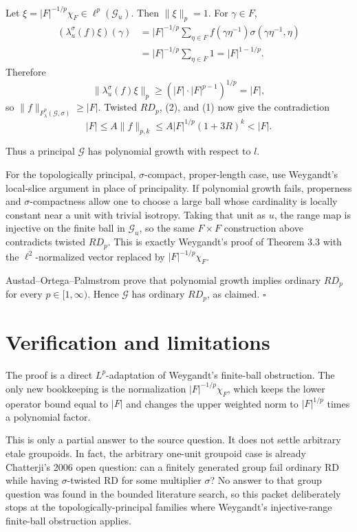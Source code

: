\documentclass[11pt]{article}
\newcommand{\G}{\mathcal G}
\begin{document}
Let \(\xi=|F|^{-1/p}\chi_F\in \ell^p(\G_u)\).  Then \(\|\xi\|_p=1\).  For
\(\gamma\in F\),
\[
\begin{aligned}
(\lambda_u^\sigma(f)\xi)(\gamma)
&=|F|^{-1/p}\sum_{\eta\in F}
f(\gamma\eta^{-1})\sigma(\gamma\eta^{-1},\eta)\\
&=|F|^{-1/p}\sum_{\eta\in F}1
=|F|^{1-1/p}.
\end{aligned}
\]
Therefore
\[
\|\lambda_u^\sigma(f)\xi\|_p
\ge \left(|F|\cdot |F|^{p-1}\right)^{1/p}=|F|,
\]
so \(\|f\|_{F_\lambda^p(\G,\sigma)}\ge |F|\).  Twisted \(RD_p\), (2), and
(1) now give the contradiction
\[
|F|\le A\|f\|_{p,k}\le A|F|^{1/p}(1+3R)^k<|F|.
\]

Thus a principal \(\G\) has polynomial growth with respect to \(l\).

For the topologically principal, \(\sigma\)-compact, proper-length case, use
Weygandt's local-slice argument in place of principality.  If polynomial growth
fails, properness and \(\sigma\)-compactness allow one to choose a large ball
whose cardinality is locally constant near a unit with trivial isotropy.  Taking
that unit as \(u\), the range map is injective on the finite ball in \(\G_u\),
so the same \(F\times F\) construction above contradicts twisted \(RD_p\).  This
is exactly Weygandt's proof of Theorem 3.3 with the \(\ell^2\)-normalized vector
replaced by \(|F|^{-1/p}\chi_F\).

Austad--Ortega--Palmstrom prove that polynomial growth implies ordinary
\(RD_p\) for every \(p\in[1,\infty)\).  Hence \(\G\) has ordinary \(RD_p\), as
claimed.
\(\square\)

\section*{Verification and limitations}

The proof is a direct \(L^p\)-adaptation of Weygandt's finite-ball obstruction.
The only new bookkeeping is the normalization \(|F|^{-1/p}\chi_F\), which keeps
the lower operator bound equal to \(|F|\) and changes the upper weighted norm to
\(|F|^{1/p}\) times a polynomial factor.

This is only a partial answer to the source question.  It does not settle
arbitrary etale groupoids.  In fact, the arbitrary one-unit groupoid case is
already Chatterji's 2006 open question: can a finitely generated group fail
ordinary RD while having \(\sigma\)-twisted RD for some multiplier
\(\sigma\)?  No answer to that group question was found in the bounded
literature search, so this packet deliberately stops at the
topologically-principal families where Weygandt's injective-range finite-ball
obstruction applies.
\end{document}

